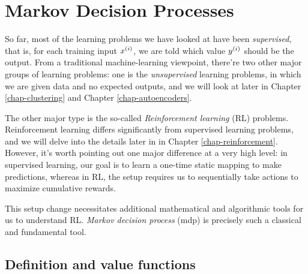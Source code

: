 \chapter{Markov Decision Processes}
\label{chap-mdps}
So far, most of the learning problems we have looked at have been {\em supervised}, that is, for each training input $x^{(i)}$, we
are told which value $y^{(i)}$ should be the output. From a traditional machine-learning viewpoint, there're two other major groups of learning problems: one is the {\em unsupervised} learning problems, in
which we are given data and no expected outputs, and we will look at later in Chapter \ref{chap-clustering} and Chapter \ref{chap-autoencoders}.

The other major type is the so-called {\em Reinforcement learning} (RL) problems. Reinforcement learning differs significantly from supervised learning problems, and we will delve into the details later in in Chapter \ref{chap-reinforcement}. However, it's worth pointing out one major difference at a very high level: in supervised learning, our goal is to learn a one-time static mapping to make predictions, whereas in RL, the setup requires us to sequentially take actions to maximize cumulative rewards.

This setup change necessitates additional mathematical and algorithmic tools for us to understand RL. {\em Markov decision process} ({\sc mdp}) is precisely such a classical and fundamental tool.



\section{Definition and value functions}
\label{sec_mdps}

